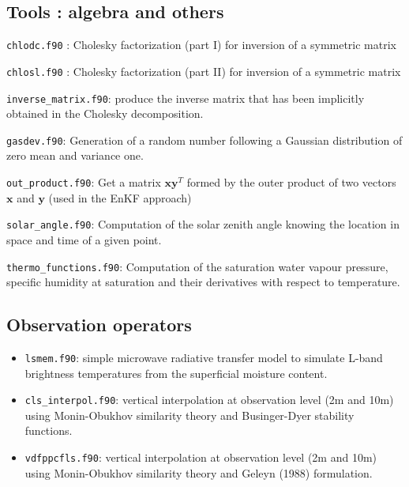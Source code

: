 \documentclass[12pt]{article}
\begin{document}
\subsection{Tools : algebra and others}
\begin{description}
\item {\tt chlodc.f90} : Cholesky factorization (part I) for inversion of a symmetric matrix
\item {\tt chlosl.f90} : Cholesky factorization (part II) for inversion of a symmetric matrix
\item {\tt inverse\_matrix.f90}: produce the inverse matrix that has been implicitly obtained
in the Cholesky decomposition.
\item {\tt gasdev.f90}:  Generation of a random number following a Gaussian distribution of zero mean and 
variance one.
\item {\tt out\_product.f90}: Get a matrix $\mathbf{xy}^T$ formed
by the outer product of two vectors $\mathbf{x}$ and $\mathbf{y}$ (used in the EnKF approach) 
\item {\tt solar\_angle.f90}: Computation of the solar zenith angle knowing the location in space
and time of a given point.
\item {\tt thermo\_functions.f90}: Computation of the saturation water vapour pressure, specific
humidity at saturation and their derivatives with respect to temperature.
\end{description}
\subsection{Observation operators}
\begin{itemize}
\item {\tt lsmem.f90}: simple microwave radiative transfer model to simulate L-band
brightness temperatures from the superficial moisture content.
\item {\tt cls\_interpol.f90}: vertical interpolation at observation level (2m and 10m) using
Monin-Obukhov similarity theory and Businger-Dyer stability functions.
\item {\tt vdfppcfls.f90}: vertical interpolation at observation level (2m and 10m) using
Monin-Obukhov similarity theory and Geleyn (1988) formulation.
\end{itemize}
\end{document}
